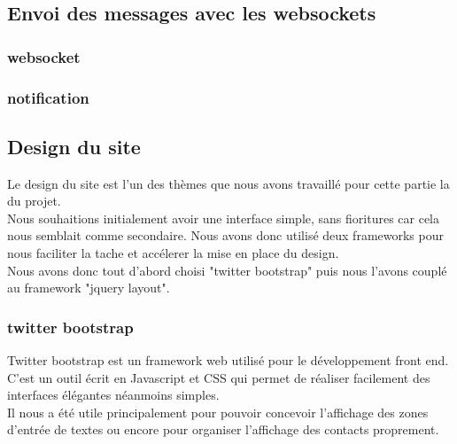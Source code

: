 \subsection{Envoi des messages avec les websockets}



\subsubsection{websocket}

\subsubsection{notification}



\subsection{Design du site}

Le design du site est l'un des thèmes que nous avons travaillé pour cette partie la du projet. 
\\
Nous souhaitions initialement avoir une interface simple, sans fioritures car cela nous semblait comme
secondaire. Nous avons donc utilisé deux frameworks pour nous faciliter la tache et accélerer la mise
en place du design.
\\
Nous avons donc tout d'abord choisi "twitter bootstrap" puis nous l'avons couplé au framework "jquery
layout".

\subsubsection{twitter bootstrap}

Twitter bootstrap est un framework web utilisé pour le développement front end. C'est un outil écrit en
Javascript et CSS qui permet de réaliser facilement des interfaces élégantes néanmoins simples. 
\\
Il nous a été utile principalement pour pouvoir concevoir l'affichage des zones d'entrée de textes ou 
encore pour organiser l'affichage des contacts proprement.
\\

